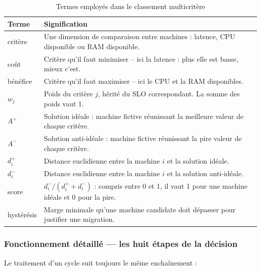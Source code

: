 \begin{table}[H]
    \centering
    \small
    \begin{tabular}{|p{2.2cm}|p{11.1cm}|}
        \hline
        \textbf{Terme} & \textbf{Signification} \\
        \hline
        critère & Une dimension de comparaison entre machines : latence, CPU disponible ou RAM disponible. \\
        \hline
        coût & Critère qu'il faut minimiser -- ici la latence : plus elle est basse, mieux c'est. \\
        \hline
        bénéfice & Critère qu'il faut maximiser -- ici le CPU et la RAM disponibles. \\
        \hline
        $w_j$ & Poids du critère $j$, hérité du SLO correspondant. La somme des poids vaut 1. \\
        \hline
        $A^{+}$ & Solution idéale : machine fictive réunissant la meilleure valeur de chaque critère. \\
        \hline
        $A^{-}$ & Solution anti-idéale : machine fictive réunissant la pire valeur de chaque critère. \\
        \hline
        $d_i^{+}$ & Distance euclidienne entre la machine $i$ et la solution idéale. \\
        \hline
        $d_i^{-}$ & Distance euclidienne entre la machine $i$ et la solution anti-idéale. \\
        \hline
        score & $d_i^{-}/(d_i^{+} + d_i^{-})$ : compris entre 0 et 1, il vaut 1 pour une machine idéale et 0 pour la pire. \\
        \hline
        hystérésis & Marge minimale qu'une machine candidate doit dépasser pour justifier une migration. \\
        \hline
    \end{tabular}
    \caption{Termes employés dans le classement multicritère}
    \label{tab:topsis-termes}
\end{table}

\subsubsection{Fonctionnement détaillé — les huit étapes de la décision}

Le traitement d'un cycle suit toujours le même enchaînement :


